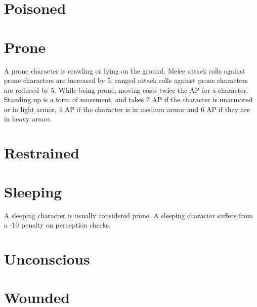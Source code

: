 \section{Poisoned}

\section{Prone}
A prone character is crawling or lying on the ground. Melee attack rolls against prone characters are increased by 5, ranged attack rolls against prone characters are reduced by 5. While being prone, moving costs twice the AP for a character.
Standing up is a form of movement, and takes 2 AP if the character is unarmored or in light armor, 4 AP if the character is in medium armor and 6 AP if they are in heavy armor.

\section{Restrained}

\section{Sleeping}
A sleeping character is usually considered prone. A sleeping character suffers from a -10 penalty on perception checks. 

\section{Unconscious}

\section{Wounded}
